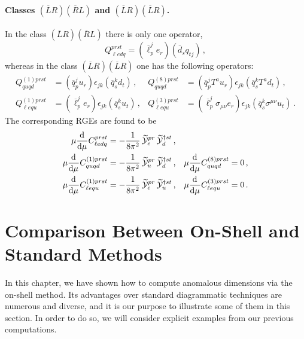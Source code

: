 \paragraph{\texorpdfstring{Classes $(\overline{L}R)(\overline{R}L)$ and $(\overline{L}R)(\overline{L}R)$}{Classes (Lbar R)(Rbar L) and (Lbar R)(Lbar R)}.}
In the class $(\overline{L}R)(\overline{R}L)$ there is only one operator,
\begin{equation}
Q_{\ell e dq}^{prst} = (\overline{\ell}_p^j e_r)(\overline{d}_sq_{tj})\,,
\end{equation}
whereas in the class $(\overline{L}R)(\overline{L}R)$ one has the following operators:
\begin{align}
Q^{(1)prst}_{quqd}&=(\overline{q}_p^j u_r)\epsilon_{jk}(\overline{q}_s^k d_t)\,,  &Q^{(8)prst}_{quqd}&=(\overline{q}_p^j T^au_r)\epsilon_{jk}(\overline{q}_s^k T^a d_t)\,, \\
Q^{(1)prst}_{\ell equ}&=(\overline{\ell}_p^j e_r)\epsilon_{jk}(\overline{q}_s^k u_t)\,,  &Q^{(3)prst}_{\ell equ}&=(\overline{\ell}_p^j \sigma_{\mu\nu}e_r)\epsilon_{jk}(\overline{q}_s^k \sigma^{\mu\nu} u_t) \,.
\end{align}
The corresponding RGEs are found to be
\begin{align}
\mu\dv[]{}{\mu}{C}_{\ell edq}^{prst} &= -\frac{1}{8\pi^2}\,\widetilde{\mathcal{Y}}_e^{pr}\,\widetilde{\mathcal{Y}}_d^{\dagger st} \, ,  && \\
\mu\dv[]{}{\mu}{C}_{quqd}^{(1)prst} &=-\frac{1}{8\pi^2}\,\widetilde{\mathcal{Y}}_u^{pr}\,\widetilde{\mathcal{Y}}_d^{\dagger st} \, ,  &
\mu\dv[]{}{\mu}{C}_{quqd}^{(8)prst} &=0\, ,  \\
\mu\dv[]{}{\mu}{C}_{\ell equ}^{(1)prst} &= -\frac{1}{8\pi^2}\,\widetilde{\mathcal{Y}}_e^{pr}\,\widetilde{\mathcal{Y}}_u^{\dagger st} \, ,  &
\mu\dv[]{}{\mu}{C}_{\ell equ}^{(3)prst} &=0\, .
\end{align}

\section{Comparison Between On-Shell and Standard Methods}
\label{sec:ALPcomparison}

In this chapter, we have shown how to compute anomalous dimensions via the on-shell method.
Its advantages over standard diagrammatic techniques are numerous and diverse, and it is our
purpose to illustrate some of them in this section.
In order to do so, we will consider explicit examples from our previous computations.


